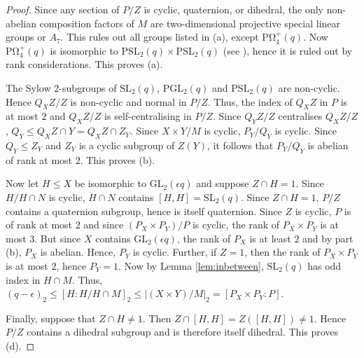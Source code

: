 \documentclass{amsart}
\theoremstyle{plain}\newtheorem{Theorem}{Theorem}[section]
\theoremstyle{plain}\newtheorem{Conjecture}[Theorem]{Conjecture}
\theoremstyle{plain}\newtheorem{Corollary}[Theorem]{Corollary}
\theoremstyle{plain}\newtheorem{Lemma}[Theorem]{Lemma}
\theoremstyle{plain}\newtheorem{Proposition}[Theorem]{Proposition}
\theoremstyle{definition}\newtheorem{Definition}[Theorem]{Definition}
\theoremstyle{definition}\newtheorem{Example}[Theorem]{Example}
\theoremstyle{definition}\newtheorem{Examples}[Theorem]{Examples}
\theoremstyle{definition}\newtheorem{Exercise}[Theorem]{Exercise}
\theoremstyle{definition}\newtheorem{Notation}[Theorem]{Notation}
\theoremstyle{definition}\newtheorem{Remark}[Theorem]{Remark}
\theoremstyle{definition}\newtheorem{Remarks}[Theorem]{Remarks}
\def\GL{\mathrm{GL}}
\def\PGL{\mathrm{PGL}}
\def\PO{\mathrm{P\Omega}}
\def\PSL{\mathrm{PSL}}
\def\SL{\mathrm{SL}}
\numberwithin{equation}{section}
\begin{document}
\begin{proof} Since any section of  $P/Z$ is  cyclic, quaternion, or  dihedral, the only non-abelian  composition factors of $M$ are two-dimensional  projective special linear groups or $A_7$. This  rules out all groups listed in (a), except  $\PO_4^{+} (q)$.  Now $\PO_4^{+} (q)$  is isomorphic to $\PSL_2(q) \times \PSL_2(q) $  (see \cite[Prop. 2.9.1]{KlLi}), hence it is ruled out by rank considerations. This proves (a).

The Sylow $2$-subgroups of $\SL_2 (q)$, $\PGL_2(q)$   and  $\PSL_2(q) $  are  non-cyclic. Hence $Q_XZ/Z$ is  non-cyclic and  normal in $P/Z$.  Thus,  the index of     $Q_XZ$  in $P$  is at most $2$  and  $Q_XZ/Z $ is    self-centralising in $P/Z$.  Since   $Q_YZ/Z$ centralises  $Q_XZ/Z$,  $Q_Y \leq  Q_X Z  \cap  Y  = Q_X Z \cap   Z_Y$.   Since $X\times Y/M$ is cyclic, $P_Y/Q_Y $ is  cyclic.    Since  $Q_Y \leq Z_Y$  and $Z_Y$  is  a cyclic  subgroup of    $Z(Y)$, it follows that  $P_Y/Q_Y $ is   abelian of rank at most $2$.  This proves (b).

Now  let $ H \leq  X $ be   isomorphic to $\GL_2(\epsilon q)$  and  suppose   $Z \cap H=1 $.    Since  $H/H\cap N  $  is cyclic,  $H\cap  N$  contains  $[H,H] =\SL_2(q)$. 
Since    $Z \cap H =1 $,  $P/Z$  contains a quaternion subgroup, hence is  itself  quaternion. Since $Z$ is  cyclic, $P$ is of rank at most  $2$ and  since   $(P_X\times P_Y)/P$ is cyclic, the rank of  $P_X \times P_Y$ is at most  $3$.  But since  $X$ contains  $\GL_2(\epsilon q) $, the  rank of $P_X$ is at  least $2$  and by part (b), $P_X $ is abelian.  Hence,  $P_Y$ is  cyclic.  Further, if   $Z=1$, then the rank  of $P_X \times P_Y$ is at most  $2$, hence $P_Y=1 $. Now by Lemma \ref{lem:inbetween},  $ \SL_2(q)$  has odd index in $H\cap M$.    Thus,   $ (q-\epsilon)_2 \leq     [H :H/ H\cap M]_2 \leq  |(X\times Y)/M |_2 =[P_X \times  P_Y: P]$.

Finally, suppose  that   $Z \cap H\neq1 $.   Then   $Z \cap  [H,H]  =Z([H,H])  \ne 1 $. Hence  $P/Z $  contains a dihedral   subgroup  and is therefore   itself dihedral. This proves (d).\end{proof}
\end{document}
